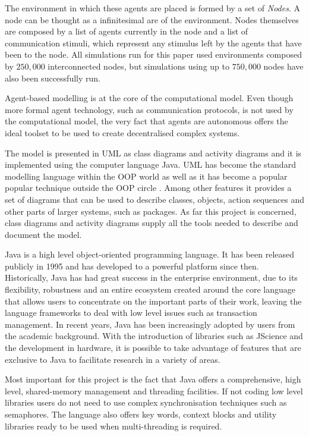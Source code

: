 The environment in which these agents are placed is formed by a set of \emph{Nodes}. A node can be thought as a infinitesimal are of the environment. Nodes themselves are composed by a list of agents currently in the node and a list of communication stimuli, which represent any stimulus left by the agents that have been to the node. All simulations run for this paper used environments composed by $250,000$ interconnected nodes, but simulations using up to $750,000$ nodes have also been successfully run.

Agent-based modelling is at the core of the computational model. Even though more formal agent technology, such as communication protocols, is not used by the computational model, the very fact that agents are autonomous offers the ideal toolset to be used to create decentralised complex systems.

The model is presented in \ac{UML} as class diagrams and activity diagrams and it is implemented using the computer language Java. \ac{UML} has become the standard modelling language within the \ac{OOP} world as well as it has become a popular popular technique outside the \ac{OOP} circle \cite{fowler2004uml}. Among other features it provides a set of diagrams that can be used to describe classes, objects, action sequences and other parts of larger systems, such as packages. As far this project is concerned, class diagrams and activity diagrams supply all the tools needed to describe and document the model.

Java is a high level object-oriented programming language. It has been released publicly in 1995 and has developed to a powerful platform since then. Historically, Java has had great success in the enterprise environment, due to its flexibility, robustness and an entire ecosystem created around the core language that allows users to concentrate on the important parts of their work, leaving the language frameworks to deal with low level issues such as transaction management. In recent years, Java has been increasingly adopted by users from the academic background. With the introduction of libraries such as JScience and the development in hardware, it is possible to take advantage of features that are exclusive to Java to facilitate research in a variety of areas.

Most important for this project is the fact that Java offers a comprehensive, high level, shared-memory management and threading facilities. If not coding low level libraries users do not need to use complex synchronisation techniques such as semaphores. The language also offers key words, context blocks and utility libraries ready to be used when multi-threading is required.

